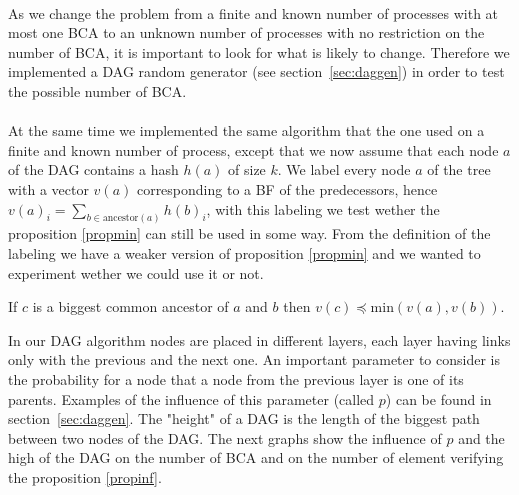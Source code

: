 \paragraph{} As we change the problem from a finite and known number of processes with at most one BCA to an unknown number of processes with no restriction on the number of BCA, it is important to look for what is likely to change. Therefore we implemented a DAG random generator (see section~\ref{sec:daggen}) in order to test the possible number of BCA. 
\paragraph{} At the same time we implemented the same algorithm that the one used on a finite and known number of process, except that we now assume that each node $a$ of the DAG contains a hash $h(a)$ of size $k$. We label every node $a$ of the tree with a vector $v(a)$ corresponding to a BF of the predecessors, hence $v(a)_i=\sum_{b\in \mathrm{ancestor}(a)} h(b)_i$, with this labeling we test wether the proposition \ref{propmin} can still be used in some way. From the definition of the labeling we have a weaker version of proposition \ref{propmin} and we wanted to experiment wether we could use it or not.
\begin{proposition}
 If $c$ is a biggest common ancestor of $a$ and $b$ then $v(c) \preccurlyeq \mathrm{min}(v(a),v(b))$. \label{propinf}
\end{proposition}
In our DAG algorithm nodes are placed in different layers, each layer having links only with the previous and the next one. An important parameter to consider is the probability for a node that a node from the previous layer is one of its parents. Examples of the influence of this parameter (called $p$) can be found in section~\ref{sec:daggen}. The "height" of a DAG is the length of the biggest path between two nodes of the DAG. The next graphs show the influence of $p$ and the high of the DAG on the number of BCA and on the number of element verifying the proposition \ref{propinf}.

